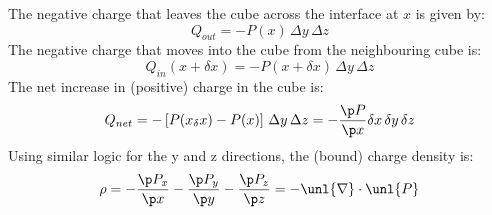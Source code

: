 \documentclass[a4paper, 11pt, normalem]{report}
\renewcommand\del{\unl{\nabla}}
\begin{document}
The negative charge that leaves the cube across the interface at $x$ is given by:
\begin{equation}
    Q_{out} = -P(x)\,\Delta y \,\Delta z
\end{equation}
The negative charge that moves into the cube from the neighbouring cube is:
\begin{equation}
    Q_{in}(x+\delta x) = -P(x+\delta x)\,\Delta y \, \Delta z
\end{equation}
The net increase in (positive) charge in the cube is:
\begin{equation}
    Q_{net} = -\left[P(x_\delta x)-P(x)\right]\,\Delta y\,\Delta z = -\frac{\p P}{\p x} \delta x \, \delta y \, \delta z
\end{equation}
Using similar logic for the y and z directions, the (bound) charge density is:
\begin{equation}
    \rho = -\frac{\p P_x}{\p x} - \frac{\p P_y}{\p y} - \frac{\p P_z}{\p z} = -\del\cdot\unl{P}
\end{equation}
\end{document}
